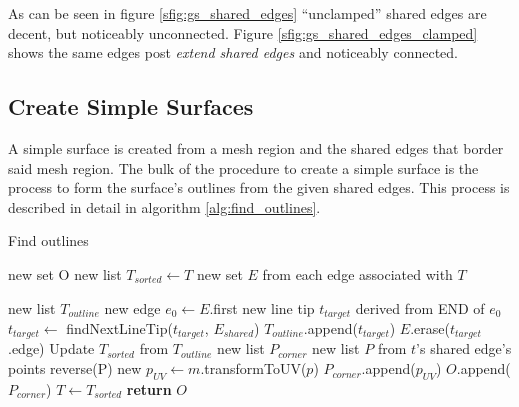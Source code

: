 As can be seen in figure \ref{sfig:gs_shared_edges} ``unclamped'' shared edges are decent, but noticeably unconnected.
Figure \ref{sfig:gs_shared_edges_clamped} shows the same edges post \textit{extend shared edges} and noticeably connected.

\subsection{Create Simple Surfaces}
A simple surface is created from a mesh region and the shared edges that border said mesh region.
The bulk of the procedure to create a simple surface is the process to form the surface's outlines from the given shared edges.
This process is described in detail in algorithm \ref{alg:find_outlines}.

\begin{algorithm}[!htb]
	\caption{Find outlines}\label{alg:find_outlines}
\begin{algorithmic}[1]
	\State new set O 
	\State new list $T_{sorted} \leftarrow T$ 
	\State new set $E$ from each edge associated with $T$

		\State new list $T_{outline}$ 
		\State new edge $e_0 \leftarrow E$.first
		\State new line tip $t_{target}$ derived from END of $e_0$
		\Repeat
			\State $t_{target} \leftarrow$ findNextLineTip($t_{target}$, $E_{shared}$)
			\State $T_{outline}$.append($t_{target}$)
			\State $E$.erase($t_{target}$.edge)
		\State Update $T_{sorted}$ from $T_{outline}$
		\State new list $P_{corner}$
			\State new list $P$ from $t$'s shared edge's points
				\State reverse(P)
			\EndIf
				\State new $p_{UV} \leftarrow m$.transformToUV($p$)
				\State $P_{corner}$.append($p_{UV}$)
			\EndFor
		\EndFor
		\State $O$.append($P_{corner}$)
	\EndWhile
	\State $T \leftarrow T_{sorted}$
	\State \textbf{return} $O$
\EndFunction
\end{algorithmic}
\end{algorithm}

